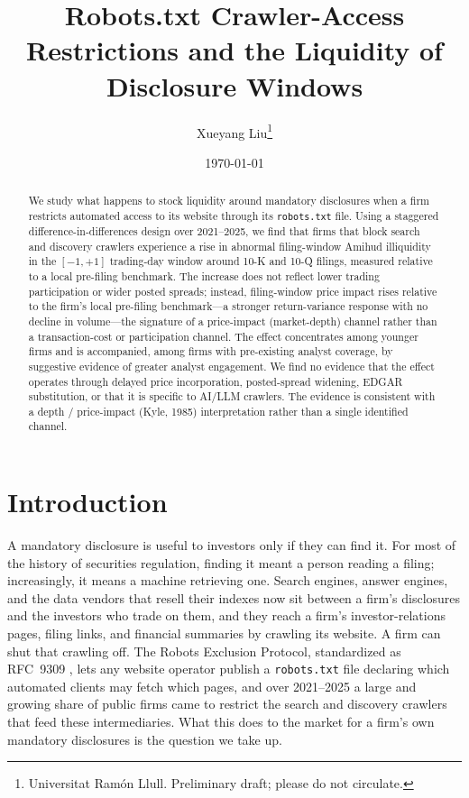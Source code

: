\documentclass[12pt]{article}
\title{Robots.txt Crawler-Access Restrictions and the Liquidity of Disclosure Windows}
\author{Xueyang Liu\thanks{Universitat Ram\'on Llull. Preliminary draft; please do not circulate.}}
\date{\today}
\begin{document}
\maketitle

\begin{abstract}
\noindent We study what happens to stock liquidity around mandatory disclosures when a firm restricts automated access to its website through its \texttt{robots.txt} file. Using a staggered difference-in-differences design over 2021--2025, we find that firms that block search and discovery crawlers experience a rise in abnormal filing-window Amihud illiquidity in the $[-1,+1]$ trading-day window around 10-K and 10-Q filings, measured relative to a local pre-filing benchmark. The increase does not reflect lower trading participation or wider posted spreads; instead, filing-window price impact rises relative to the firm's local pre-filing benchmark---a stronger return-variance response with no decline in volume---the signature of a price-impact (market-depth) channel rather than a transaction-cost or participation channel. The effect concentrates among younger firms and is accompanied, among firms with pre-existing analyst coverage, by suggestive evidence of greater analyst engagement. We find no evidence that the effect operates through delayed price incorporation, posted-spread widening, EDGAR substitution, or that it is specific to AI/LLM crawlers. The evidence is consistent with a depth / price-impact (Kyle, 1985) interpretation rather than a single identified channel.
\end{abstract}

\section{Introduction}\label{sec:intro}
A mandatory disclosure is useful to investors only if they can find it. For most of the history of securities regulation, finding it meant a person reading a filing; increasingly, it means a machine retrieving one. Search engines, answer engines, and the data vendors that resell their indexes now sit between a firm's disclosures and the investors who trade on them, and they reach a firm's investor-relations pages, filing links, and financial summaries by crawling its website. A firm can shut that crawling off. The Robots Exclusion Protocol, standardized as RFC~9309 \citep{RFC9309}, lets any website operator publish a \texttt{robots.txt} file declaring which automated clients may fetch which pages, and over 2021--2025 a large and growing share of public firms came to restrict the search and discovery crawlers that feed these intermediaries. What this does to the market for a firm's own mandatory disclosures is the question we take up.
\end{document}
